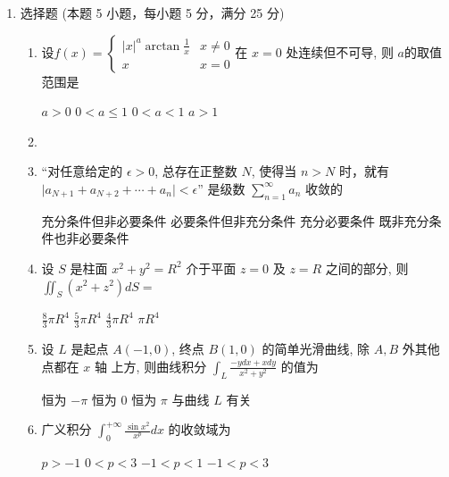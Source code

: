 \begin{enumerate}
\item
选择题 (本题 5 小题，每小题 5 分，满分 25 分)
\begin{enumerate}
	\item
	设$f(x)=\left\{\begin{array}{ll}|x|^{a} \arctan \frac{1}{x} & x \neq 0 \\ x & x=0\end{array}\right.$在 $x=0$ 处连续但不可导, 则 $a$的取值范围是  
	
	
\fourchoices
{$a>0$}
{$0<a \leqslant 1$}
{$0<a<1$}
{$a>1$}

\item 


\item
“对任意给定的 $\epsilon>0$, 总存在正整数 $N$, 使得当 $n>N$ 时，就有 $\mid a_{N+1}+a_{N+2}+\cdots+a_{n} \mid<\epsilon $” 是级数 $\sum\limits_{n=1}^{\infty} a_{n}$ 收敛的  


\fourchoices
{充分条件但非必要条件}
{必要条件但非充分条件}
{充分必要条件}
{既非充分条件也非必要条件}

	
\item 
设 $S$ 是柱面 $x^{2}+y^{2}=R^{2}$ 介于平面 $z=0$ 及 $z=R$ 之间的部分, 则 $\iint_{S}\left(x^{2}+z^{2}\right) d S=$ 


\fourchoices
{$\frac{8}{3} \pi R^{4}$}
{$\frac{5}{3} \pi R^{4}$}
{$\frac{4}{3} \pi R^{4}$}
{$\pi R^{4}$}

\item 
设 $L$ 是起点 $A(-1,0)$, 终点 $B(1,0)$ 的简单光滑曲线, 除 $A, B$ 外其他点都在 $x$ 轴
上方, 则曲线积分 $\int_{L} \frac{-y d x+x d y}{x^{2}+y^{2}}$ 的值为  


\fourchoices
{恒为 $-\pi$}
{恒为 $ 0 $}
{恒为 $\pi$}
{与曲线 $L$ 有关}

\item 
广义积分 $\int_{0}^{+\infty} \frac{\sin x^{2}}{x^{p}} d x$ 的收敛域为  


\fourchoices
{$p>-1$}
{$0<p<3$}
{$-1<p<1$}
{$-1<p<3$}


	
	
\end{enumerate}

\end{enumerate}
